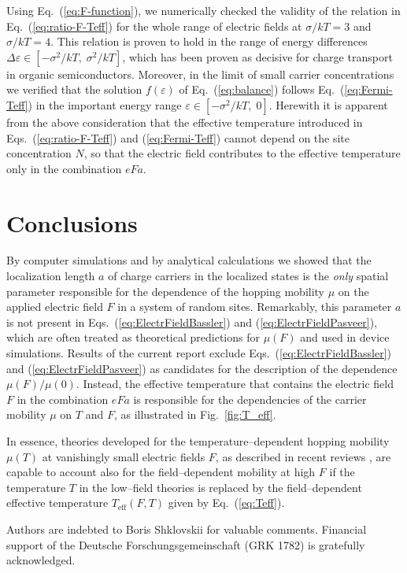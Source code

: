 \documentclass[aps,reprint,amsmath,amssymb,superscriptaddress,showpacs,prb]{revtex4-1}
\newcommand{\ve}{\varepsilon}
\renewcommand{\alpha}{ a }
\begin{document}
Using Eq.~(\ref{eq:F-function}), we numerically checked the validity of the relation in Eq.~(\ref{eq:ratio-F-Teff}) for the whole range of electric fields at $\sigma/kT = 3$ and  $\sigma/kT = 4$. This relation is proven to hold in the range of energy differences $\Delta\ve \in [-\sigma^2/kT, \; \sigma^2/kT]$, which has been proven\cite{Bassler1993,Baranovski2006,Tessler2009,Baranovskii2014,Nenashev_Topical_2015,Ostroverkhova2016} as decisive for charge transport in organic semiconductors. Moreover, in the limit of small carrier concentrations we verified that the solution $f(\ve)$ of Eq.~(\ref{eq:balance}) follows Eq.~(\ref{eq:Fermi-Teff}) in the important energy range $\ve \in [-\sigma^2/kT, \; 0]$. Herewith it is apparent from the above consideration that the effective temperature introduced in Eqs.~(\ref{eq:ratio-F-Teff}) and (\ref{eq:Fermi-Teff}) cannot depend on the site concentration $N$, so that the electric field contributes to the effective temperature only in the combination $eF\alpha$.

\section{Conclusions}
\label{sec:conclusions}

By computer simulations and by analytical calculations we showed that the localization length $a$ of charge carriers in the localized states is the \textit{only} spatial parameter responsible for the dependence of the hopping mobility $\mu$ on the applied electric field $F$ in a system of random sites. Remarkably, this parameter $\alpha$ is not present in Eqs.~(\ref{eq:ElectrFieldBassler}) and (\ref{eq:ElectrFieldPasveer}), which are often treated as theoretical predictions for $\mu(F)$ and used in device simulations.  Results of the current report exclude Eqs.~(\ref{eq:ElectrFieldBassler}) and (\ref{eq:ElectrFieldPasveer}) as candidates for the description of the dependence $\mu(F)/\mu(0)$. Instead, the effective temperature that contains the electric field $F$ in the combination $eF\alpha$ is responsible for the dependencies of the carrier mobility $\mu$ on $T$ and $F$, as illustrated in Fig.~\ref{fig:T_eff}.

In essence, theories developed for the temperature--dependent hopping mobility $\mu(T)$ at vanishingly small electric fields $F$, as described in recent reviews \cite{Baranovskii2014,Nenashev_Topical_2015}, are capable to account also for the field--dependent mobility at high $F$ if the temperature $T$ in the low--field theories is replaced by the field--dependent effective temperature $T_{\text{eff}}(F,T)$ given by Eq.~(\ref{eq:Teff}).



\begin{acknowledgments}
Authors are indebted to Boris Shklovskii for valuable comments.	Financial support of the Deutsche Forschungsgemeinschaft (GRK 1782) is gratefully acknowledged.
\end{acknowledgments}


\end{document}

